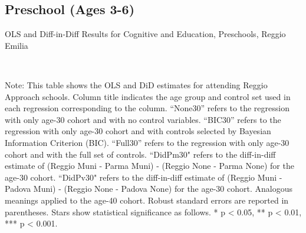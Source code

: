 \begin{landscape}
\subsection{Preschool (Ages 3-6)}

\begin{table}[H] \caption{OLS and Diff-in-Diff Results for Cognitive and Education, Preschools, Reggio Emilia} \label{ols-E-reg}
\scalebox{0.85}{}
\vspace{1ex} \\
\footnotesize\raggedright{Note: This table shows the OLS and DiD estimates for attending Reggio Approach schools. Column title indicates the age group and control set used in each regression corresponding to the column. ``None30'' refers to the regression with only age-30 cohort and with no control variables. ``BIC30'' refers to the regression with only age-30 cohort and with controls selected by Bayesian Information Criterion (BIC). ``Full30'' refers to the regression with only age-30 cohort and with the full set of controls. ``DidPm30" refers to the diff-in-diff estimate of (Reggio Muni - Parma Muni) - (Reggio None - Parma None) for the age-30 cohort. ``DidPv30" refers to the diff-in-diff estimate of (Reggio Muni - Padova Muni) - (Reggio None - Padova None) for the age-30 cohort. Analogous meanings applied to the age-40 cohort. Robust standard errors are reported in parentheses. Stars show statistical significance as follows. * p < 0.05, ** p < 0.01, *** p < 0.001.}
\end{table}



\end{landscape}
